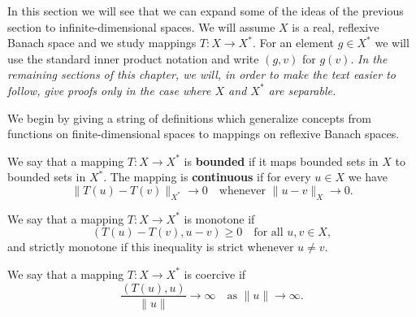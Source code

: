 In this section we will see that we can expand some of the ideas of the previous section to infinite-dimensional spaces. We will assume $X$ is a real, reflexive Banach space and we study mappings $T:X\to X^*$. For an element $g\in X^*$ we will use the standard inner product notation and write $(g,v)$ for $g(v)$. \emph{In the remaining sections of this chapter, we will, in order to make the text easier to follow, give proofs only in the case where $X$ and $X^*$ are separable.}

We begin by giving a string of definitions which generalize concepts from functions on finite-dimensional spaces to mappings on reflexive Banach spaces.

\begin{Definition}
\label{def:banach-nonlinear-bounded-continuous-mapping}
We say that a mapping $T:X\to X^*$ is \textbf{bounded} if it maps bounded sets in $X$ to bounded sets in $X^*$. The mapping is \textbf{continuous} if for every $u\in X$ we have
\begin{equation}\label{eq:banach-nonlinear-mapping-continuity-definition}
\|T(u)-T(v)\|_{X^*}\to0\quad\text{whenever }\|u-v\|_X\to0.
\end{equation}

\end{Definition}

\begin{Definition}
\label{def:banach-nonlinear-monotone-mapping}
We say that a mapping $T:X\to X^*$ is monotone if
\begin{equation}\label{eq:banach-nonlinear-mapping-monotonicity-definition}
(T(u)-T(v),u-v)\geq0\quad\text{for all }u,v\in X,
\end{equation}
and strictly monotone if this inequality is strict whenever $u\neq v$.
\end{Definition}

\begin{Definition}
\label{def:banach-nonlinear-coercive-mapping}
We say that a mapping $T:X\to X^*$ is coercive if
\begin{equation}\label{eq:banach-nonlinear-mapping-coercivity-definition}
\dfrac{(T(u),u)}{\|u\|}\to\infty\quad\text{as }\|u\|\to\infty.
\end{equation}

\end{Definition}

